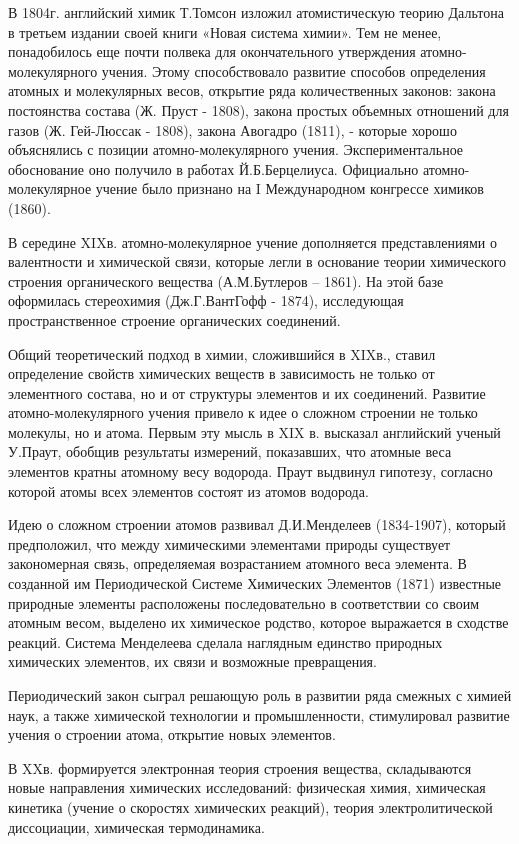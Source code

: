 \documentclass[exam_answers.tex]{subfiles}
\begin{document}
В 1804г. английский химик Т.Томсон изложил атомистическую теорию
Дальтона в третьем издании своей книги «Новая система химии». Тем не менее,
понадобилось еще почти полвека для окончательного утверждения атомно-молекулярного учения.
Этому способствовало развитие способов определения
атомных и молекулярных весов, открытие ряда количественных законов: закона
постоянства состава (Ж. Пруст - 1808), закона простых объемных отношений
для газов (Ж. Гей-Люссак - 1808), закона Авогадро (1811), - которые хорошо
объяснялись с позиции атомно-молекулярного учения. Экспериментальное
обоснование оно получило в работах Й.Б.Берцелиуса. Официально атомно-молекулярное
учение было признано на I Международном конгрессе химиков (1860).

В середине XIXв. атомно-молекулярное учение дополняется
представлениями о валентности и химической связи, которые легли в
основание теории химического строения органического вещества
(А.М.Бутлеров – 1861). На этой базе оформилась стереохимия (Дж.Г.ВантГофф - 1874),
исследующая пространственное строение органических соединений.

Общий теоретический подход в химии, сложившийся в XIXв., ставил
определение свойств химических веществ в зависимость не только от
элементного состава, но и от структуры элементов и их соединений. Развитие
атомно-молекулярного учения привело к идее о сложном строении не только
молекулы, но и атома. Первым эту мысль в XIX в. высказал английский ученый
У.Праут, обобщив результаты измерений, показавших, что атомные веса
элементов кратны атомному весу водорода. Праут выдвинул гипотезу, согласно
которой атомы всех элементов состоят из атомов водорода.

Идею о сложном строении атомов развивал Д.И.Менделеев (1834-1907),
который предположил, что между химическими элементами природы
существует закономерная связь, определяемая возрастанием атомного веса
элемента. В созданной им Периодической Системе Химических Элементов
(1871) известные природные элементы расположены последовательно в
соответствии со своим атомным весом, выделено их химическое родство,
которое выражается в сходстве реакций. Система Менделеева сделала
наглядным единство природных химических элементов, их связи и возможные
превращения. 

Периодический закон сыграл решающую роль в развитии ряда смежных с
химией наук, а также химической технологии и промышленности,
стимулировал развитие учения о строении атома, открытие новых элементов.

В XXв. формируется электронная теория строения вещества,
складываются новые направления химических исследований: физическая
химия, химическая кинетика (учение о скоростях химических реакций), теория
электролитической диссоциации, химическая термодинамика.
\end{document}
